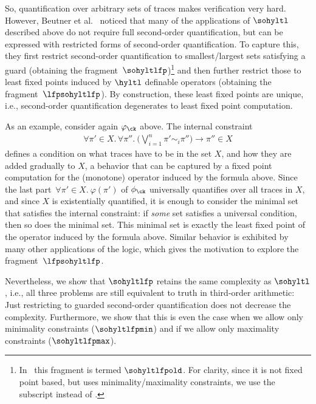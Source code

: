 So, quantification over arbitrary sets of traces makes verification very hard. 
However, Beutner et al.~\cite{DBLP:conf/cav/BeutnerFFM23} noticed that many of the applications of $\sohyltl$ described above do not require full second-order quantification, but can be expressed with restricted forms of second-order quantification.
To capture this, they first restrict second-order quantification to smallest/largest sets satisfying a guard  (obtaining the fragment~$\sohyltlfp$)\footnote{In~\cite{DBLP:conf/cav/BeutnerFFM23} this fragment is termed $\sohyltlfpold$. For clarity, since it is not fixed point based, but uses minimality/maximality constraints, we use the subscript  instead of .} and then further restrict those to least fixed points induced by $\hyltl$ definable operators (obtaining the fragment~$\lfpsohyltlfp$). By construction, these least fixed points are unique, i.e., second-order quantification degenerates to least fixed point computation.

As an example, consider again $ \varphi_\ck $ above. The internal constraint 
\begin{align*}
    \forall \pi' \in X.\, \forall \pi''.\ \big(\bigvee\nolimits_{i=1}^n \pi' \sim_i \pi'' \big) \rightarrow \pi'' \in X 
\end{align*}
defines a condition on what traces have to be in the set $X$, and how they are added gradually to $X$, a behavior that can be captured by a fixed point computation for the (monotone) operator induced by the formula above. Since the last part~$\forall \pi' \in X.\ \varphi({\pi'})$ of $\phi_\ck$ universally quantifies over all traces in $X$, and since $X$ is existentially quantified, it is enough to consider the minimal set that satisfies the internal constraint: if \emph{some} set satisfies a universal condition, then so does the minimal set.
This minimal set is exactly the least fixed point of the operator induced by the formula above.
Similar behavior is exhibited by many other applications of the logic, which gives the motivation to explore the fragment~$\lfpsohyltlfp$.

Nevertheless, we show that $\sohyltlfp$ retains the same complexity as $\sohyltl$, i.e., all three problems are still equivalent to  truth in third-order arithmetic: Just restricting to guarded second-order quantification does not decrease the complexity. Furthermore, we show that this is even the case when we allow only minimality constraints ($\sohyltlfpmin$) and if we allow only maximality constraints ($\sohyltlfpmax$).

